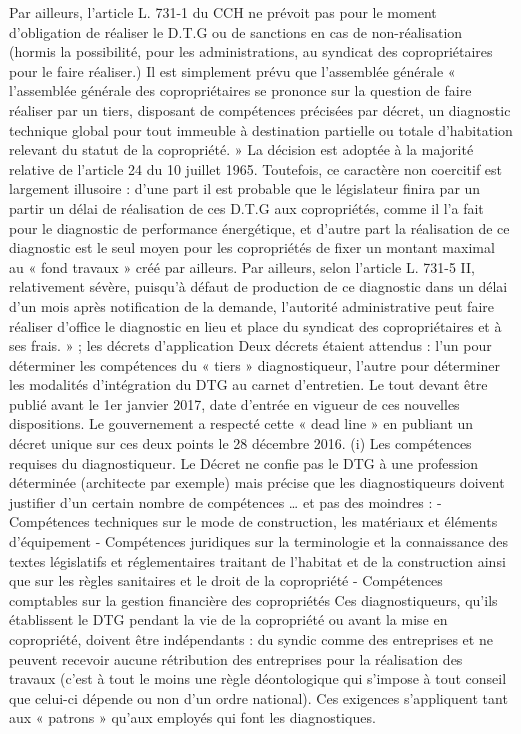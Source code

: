 		Par ailleurs, l’article L. 731-1 du CCH ne prévoit pas pour le moment d’obligation de réaliser le D.T.G ou de sanctions en cas de non-réalisation (hormis la possibilité, pour les administrations, au syndicat des copropriétaires pour le faire réaliser.) Il est simplement prévu que l’assemblée générale « l'assemblée générale des copropriétaires se prononce sur la question de faire réaliser par un tiers, disposant de compétences précisées par décret, un diagnostic technique global pour tout immeuble à destination partielle ou totale d'habitation relevant du statut de la copropriété. » La décision est adoptée à la majorité relative de l’article 24 du 10 juillet 1965. Toutefois, ce caractère non coercitif est largement illusoire : d’une part il est probable que le législateur finira par un partir un délai de réalisation de ces D.T.G aux copropriétés, comme il l’a fait pour le diagnostic de performance énergétique, et d’autre part la réalisation de ce diagnostic est le seul moyen pour les copropriétés de fixer un montant maximal au « fond travaux » créé par ailleurs.
		Par ailleurs, selon l’article L. 731-5 II, relativement sévère, puisqu’à défaut de production de ce diagnostic dans un délai d'un mois après notification de la demande, l'autorité administrative peut faire réaliser d'office le diagnostic en lieu et place du syndicat des copropriétaires et à ses frais. » ;
		les décrets d’application
		Deux décrets étaient attendus : l’un pour déterminer les compétences du « tiers » diagnostiqueur, l’autre pour déterminer les modalités d’intégration du DTG au carnet
		d’entretien. Le tout devant être publié avant le 1er janvier 2017, date d’entrée en vigueur de ces nouvelles dispositions. Le gouvernement a respecté cette « dead line » en publiant un décret unique sur ces deux points le 28 décembre 2016.
		(i) Les compétences requises du diagnostiqueur.
		Le Décret ne confie pas le DTG à une profession déterminée (architecte par exemple) mais précise que les diagnostiqueurs doivent justifier d’un certain nombre de compétences … et pas des moindres :
		- Compétences techniques sur le mode de construction, les matériaux et éléments d’équipement
		- Compétences juridiques sur la terminologie et la connaissance des textes législatifs et réglementaires traitant de l’habitat et de la construction ainsi que sur les règles sanitaires et le droit de la copropriété
		- Compétences comptables sur la gestion financière des copropriétés
		Ces diagnostiqueurs, qu’ils établissent le DTG pendant la vie de la copropriété ou avant la mise en copropriété, doivent être indépendants : du syndic comme des entreprises et ne peuvent recevoir aucune rétribution des entreprises pour la réalisation des travaux (c’est à tout le moins une règle déontologique qui s’impose à tout conseil que celui-ci dépende ou non d’un ordre national). Ces exigences s’appliquent tant aux « patrons » qu’aux employés qui font les diagnostiques.
